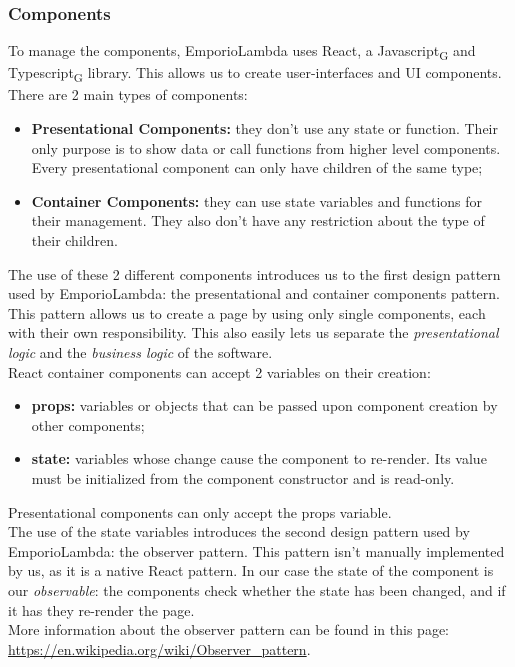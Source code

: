 \subsubsection{Components}
To manage the components, EmporioLambda uses React, a Javascript\textsubscript{G} and Typescript\textsubscript{G} library. This allows us to create user-interfaces and UI components.
There are 2 main types of components:
\begin{itemize}
\item \textbf{Presentational Components:} they don't use any state or function. Their only purpose is to show data or call functions from higher level components. Every presentational component can only have children of the same type;
\item \textbf{Container Components:} they can use state variables and functions for their management. They also don't have any restriction about the type of their children.
\end{itemize}
The use of these 2 different components introduces us to the first design pattern used by EmporioLambda: the presentational and container components pattern. This pattern allows us to create a page by using only single components, each with their own responsibility. This also easily lets us separate the \textit{presentational logic} and the \textit{business logic} of the software.\\
React container components can accept 2 variables on their creation:
\begin{itemize}
\item \textbf{props:} variables or objects that can be passed upon component creation by other components;
\item \textbf{state:} variables whose change cause the component to re-render. Its value must be initialized from the component constructor and is read-only.
\end{itemize}
Presentational components can only accept the props variable.\\
The use of the state variables introduces the second design pattern used by EmporioLambda: the observer pattern. This pattern isn't manually implemented by us, as it is a native React pattern. In our case the state of the component is our \textit{observable}: the components check whether the state has been changed, and if it has they re-render the page.\\More information about the observer pattern can be found in this page:\\
\url{https://en.wikipedia.org/wiki/Observer_pattern}.\\